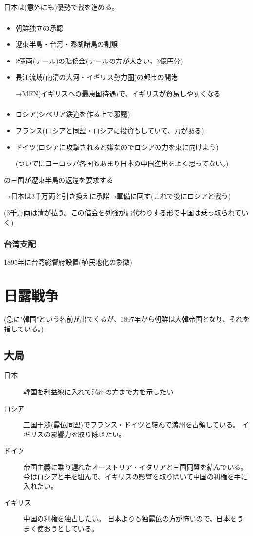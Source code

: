 \documentclass[12pt,fleqn]{ltjsarticle}
\begin{document}
日本は(意外にも)優勢で戦を進める。

\subsubsection{}
\begin{itemize}
    \item 朝鮮独立の承認
    \item 遼東半島・台湾・澎湖諸島の割譲
    \item 2億両(テール)の賠償金(テールの方が大きい、3億円分)
    \item 長江流域(南清の大河・イギリス勢力圏)の都市の開港

        →MFN(イギリスへの最恵国待遇)で、イギリスが貿易しやすくなる
\end{itemize}

\subsubsection{}
\begin{itemize}
    \item ロシア(シベリア鉄道を作る上で邪魔)
    \item フランス(ロシアと同盟・ロシアに投資もしていて、力がある)
    \item ドイツ(ロシアに攻撃されると嫌なのでロシアの力を東に向けよう)

        (ついでにヨーロッパ各国もあまり日本の中国進出をよく思ってない。)
\end{itemize}
の三国が遼東半島の返還を要求する

→日本は3千万両と引き換えに承諾→軍備に回す(これで後にロシアと戦う)

(3千万両は清が払う。この借金を列強が肩代わりする形で中国は乗っ取られていく)

\subsubsection{台湾支配}
1895年に台湾総督府設置(植民地化の象徴)

\clearpage
\section{日露戦争}
(急に"韓国"という名前が出てくるが、1897年から朝鮮は大韓帝国となり、それを指している。)
\subsection*{大局}
\begin{description}
    \item[日本]韓国を利益線に入れて満州の方まで力を示したい
    \item[ロシア]三国干渉(露仏同盟)でフランス・ドイツと結んで満州を占領している。
        イギリスの影響力を取り除きたい。
    \item[ドイツ]帝国主義に乗り遅れたオーストリア・イタリアと三国同盟を結んでいる。
        今はロシアと手を組んで、イギリスの影響を取り除いて中国の利権を手に入れたい。
    \item[イギリス]中国の利権を独占したい。
        日本よりも独露仏の方が怖いので、日本をうまく使おうとしている。
\end{description}
\end{document}

